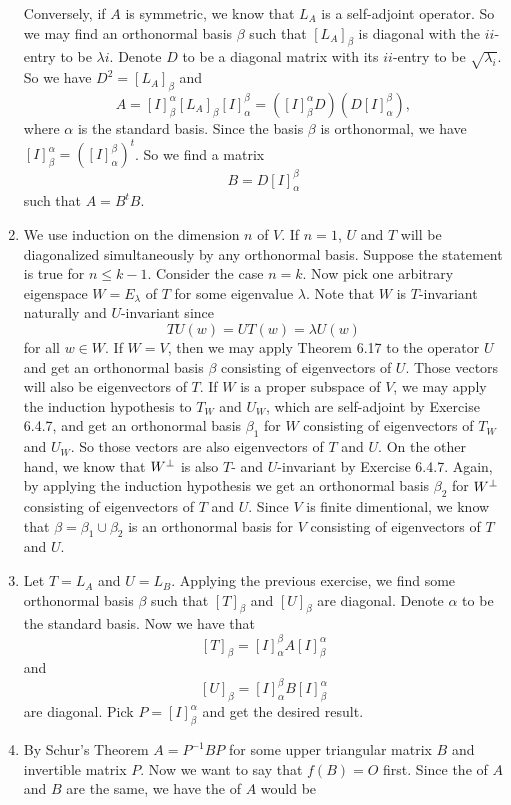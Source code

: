 \begin{enumerate}
Conversely, if $A$ is symmetric, we know that $L_A$ is a self-adjoint operator. So we may find an orthonormal basis $\beta $ such that $[L_A]_{\beta }$ is diagonal with the $ii$-entry to be $\lambda i$. Denote $D$ to be a diagonal matrix with its $ii$-entry to be $\sqrt{\lambda_i}$. So we have $D^2=[L_A]_{\beta }$ and 
\[A=[I]_{\beta}^{\alpha}[L_A]_{\beta}[I]_{\alpha}^{\beta}=([I]_{\beta}^{\alpha}D)(D[I]_{\alpha}^{\beta}),\]
where $\alpha $ is the standard basis. Since the basis $\beta $ is orthonormal, we have $[I]_{\beta}^{\alpha}=([I]_{\alpha}^{\beta})^t$. So we find a matrix 
\[B=D[I]_{\alpha}^{\beta}\]
such that $A=B^tB$.
\item We use induction on the dimension $n$ of $V$. If $n=1$, $U$ and $T$ will be diagonalized simultaneously by any orthonormal basis. Suppose the statement is true for $n\leq k-1$. Consider the case $n=k$. Now pick one arbitrary eigenspace $W=E_{\lambda}$ of $T$ for some eigenvalue $\lambda$. Note that $W$ is $T$-invariant naturally and $U$-invariant since 
\[TU(w)=UT(w)=\lambda U(w)\]
for all $w\in W$. If $W=V$, then we may apply Theorem 6.17 to the operator $U$ and get an orthonormal basis $\beta $ consisting of eigenvectors of $U$. Those vectors will also be eigenvectors of $T$. If $W$ is a proper subspace of $V$, we may apply the induction hypothesis to $T_W$ and $U_W$, which are self-adjoint by Exercise 6.4.7, and get an orthonormal basis $\beta_1$ for $W$ consisting of eigenvectors of $T_W$ and $U_W$. So those vectors are also eigenvectors of $T$ and $U$. On the other hand, we know that $W^{\perp}$ is also $T$- and $U$-invariant by Exercise 6.4.7. Again, by applying the induction hypothesis we get an orthonormal basis $\beta_2$ for $W^{\perp}$ consisting of eigenvectors of $T$ and $U$. Since $V$ is finite dimentional, we know that $\beta =\beta_1\cup \beta_2$ is an orthonormal basis for $V$ consisting of eigenvectors of $T$ and $U$.
\item Let $T=L_A$ and $U=L_B$. Applying the previous exercise, we find some orthonormal basis $\beta $ such that $[T]_{\beta}$ and $[U]_{\beta}$ are diagonal. Denote $\alpha $ to be the standard basis. Now we have that
\[[T]_{\beta}=[I]_{\alpha}^{\beta}A[I]_{\beta}^{\alpha}\]
and 
\[[U]_{\beta}=[I]_{\alpha}^{\beta}B[I]_{\beta}^{\alpha}\]
are diagonal. Pick $P=[I]_{\beta}^{\alpha}$ and get the desired result.
\item By Schur's Theorem $A=P^{-1}BP$ for some upper triangular matrix $B$ and invertible matrix $P$. Now we want to say that $f(B)=O$ first. Since the \charpoly{} of $A$ and $B$ are the same, we have the \charpoly{} of $A$ would be 

\end{enumerate}

